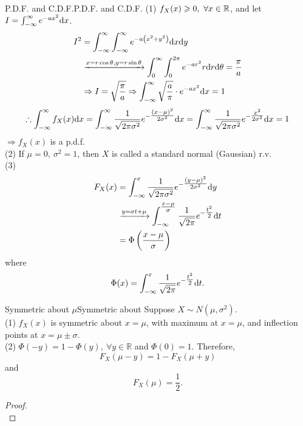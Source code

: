 \documentclass{elegantbook}
\begin{document}
\begin{remark}{P.D.F. and C.D.F.}{P.D.F. and C.D.F.}
(1) $f_X(x)\geqslant0,\ \forall x\in\mathbb{R}$, and let $I=\int_{-\infty}^{\infty}e^{-ax^2}\dif x$.
$$\begin{aligned}
I^2&=\int_{-\infty}^{\infty}\int_{-\infty}^{\infty}{e^{-a\left(x^2+y^2\right)}\dif x\dif y}\\
&\xrightarrow{x=r\cos\theta,y=r\sin\theta}\int_{0}^{\infty}\int_{0}^{2\pi}{e^{-ar^2}r\dif r\dif\theta}=\frac{\pi}{a}\\
&\Rightarrow I=\sqrt{\frac{\pi}{a}}\Rightarrow\int_{-\infty}^{\infty}{\sqrt{\frac{a}{\pi}}}\cdot e^{-ax^2}\dif x=1
\end{aligned}
$$
$$
\therefore\int_{-\infty}^{\infty}{f_X(x)}\dif x=\int_{-\infty}^{\infty}{\frac{1}{\sqrt{2\pi\sigma^2}}e^{-\tfrac{(x-\mu)^2}{2\sigma^2}}}\dif x=\int_{-\infty}^{\infty}{\frac{1}{\sqrt{2\pi\sigma^2}}e^{-\tfrac{x^2}{2\sigma^2}}}\dif x=1
$$
$\Rightarrow f_X(x)$ is a p.d.f.\\
(2) If $\mu=0,\ \sigma^2=1$, then $X$ is called a standard normal (Gaussian) r.v.\\
(3)
$$\begin{aligned}
F_X(x)&=\int_{-\infty}^{x}{\frac{1}{\sqrt{2\pi\sigma^2}}e^{-\tfrac{(y-\mu)^2}{2\sigma^2}}}\dif y\\
&\xrightarrow{y=\sigma t+\mu}\int_{-\infty}^{\tfrac{x-\mu}{\sigma}}{\frac{1}{\sqrt{2\pi}}e^{-\tfrac{{t}^2}{2}}}\dif t\\
&={\Phi}\left(\frac{x-\mu}{\sigma}\right)\\
\end{aligned}
$$
where
$$
{\Phi}(x)=\int_{-\infty}^{x}{\frac{1}{\sqrt{2\pi}}e^{-\tfrac{{t}^2}{2}}}\dif t.
$$
\end{remark}

\begin{theorem}{Symmetric about ${\mu}$}{Symmetric about}
Suppose $X\sim N(\mu,\sigma^2)$.\\
(1) $f_X(x)$ is symmetric about $x=\mu$, with maximum at $x=\mu$, and inflection points at $x=\mu\pm\sigma$.\\
(2) $\Phi\left(-y\right)=1-{\Phi}(y),\ \forall y\in\mathbb{R}$ and $\Phi\left(0\right)=1$. Therefore, $$F_X\left(\mu-y\right)=1-F_X\left(\mu+y\right)$$ and $$F_X\left(\mu\right)=\frac{1}{2}.$$
\end{theorem}

\begin{proof}
\\[4cm]\vspace{0.01cm}
\end{proof}
\end{document}
